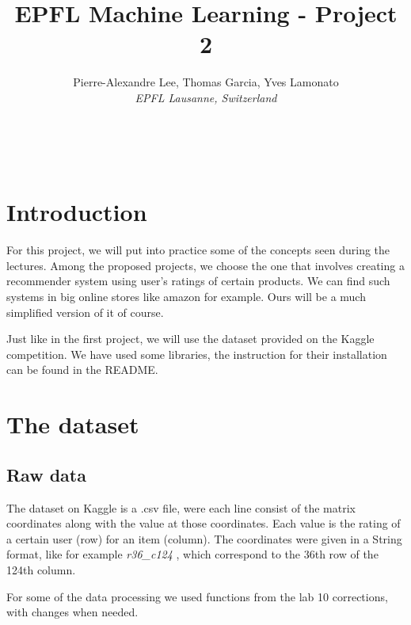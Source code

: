 \documentclass[a4paper]{article}
\begin{document}
\title{EPFL Machine Learning - Project 2}
\author{
  Pierre-Alexandre Lee, Thomas Garcia, Yves Lamonato\\
  \textit{EPFL Lausanne, Switzerland}
}
\date{\vspace{-5ex}}

\maketitle
\mbox{}\\

\section{Introduction}
For this project, we will put into practice some of the concepts seen during the lectures. 
Among the proposed projects, we choose the one that involves creating a recommender system using user's ratings of certain products. 
We can find such systems in big online stores like amazon for example. Ours will be a much simplified version of it of course.  

Just like in the first project, we will use the dataset provided on the Kaggle competition. We have used some libraries, the instruction for their installation can be found in the README.

\section{The dataset}
\subsection{Raw data}
The dataset on Kaggle is a .csv file, were each line consist of the matrix coordinates along with the value at those coordinates. Each value is the rating of a certain user (row) for an item (column). The coordinates were given in a String format, like for example \textit{r36\_c124} , which correspond to the 36th row of the 124th column. 

For some of the data processing we used functions from the lab 10 corrections, with changes when needed.
\end{document}
